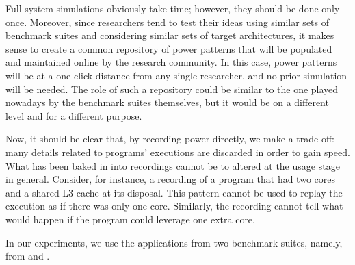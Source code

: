 Full-system simulations obviously take time; however, they should be done only
once. Moreover, since researchers tend to test their ideas using similar sets of
benchmark suites and considering similar sets of target architectures, it makes
sense to create a common repository of power patterns that will be populated and
maintained online by the research community. In this case, power patterns will
be at a one-click distance from any single researcher, and no prior simulation
will be needed. The role of such a repository could be similar to the one played
nowadays by the benchmark suites themselves, but it would be on a different
level and for a different purpose.

Now, it should be clear that, by recording power directly, we make a trade-off:
many details related to programs' executions are discarded in order to gain
speed. What has been baked in into recordings cannot be to altered at the usage
stage in general. Consider, for instance, a recording of a program that had two
cores and a shared L3 cache at its disposal. This pattern cannot be used to
replay the execution as if there was only one core. Similarly, the recording
cannot tell what would happen if the program could leverage one extra core.

In our experiments, we use the applications from two benchmark suites, namely,
from  \cite{bienia2011} and  \cite{cpu2006}.

